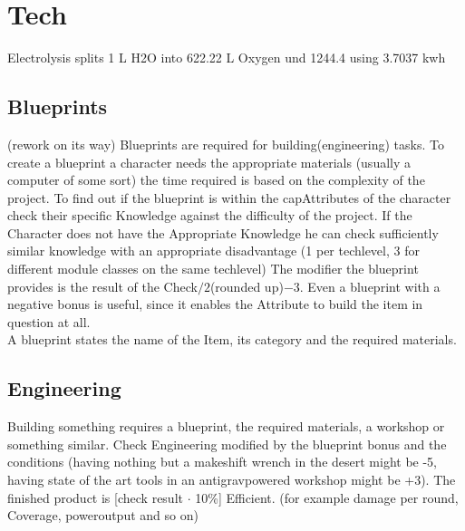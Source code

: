 \section{Tech}\label{subsec:tech}
Electrolysis splits 1 L H2O into 622.22 L Oxygen und 1244.4 using 3.7037 kwh\\
\subsection{Blueprints}
(rework on its way)
Blueprints are required for building(engineering) tasks.
To create a blueprint a character needs the appropriate materials
(usually a computer of some sort) the time required is based on the complexity of the project.
To find out if the
blueprint is within the capAttributes of the character check their specific Knowledge against the difficulty of the
project.
If the Character does not have the Appropriate Knowledge he can check sufficiently similar knowledge with
an appropriate disadvantage (1 per techlevel, 3 for different module classes on the same techlevel)
The modifier the blueprint provides is the result of the Check\(/2\)(rounded up)\(-3\).
Even a blueprint with a negative bonus is useful, since it enables the Attribute to build the item in question at all.\\
A blueprint states the name of the Item, its category and the required materials.\vspace{1.5cm}
\subsection{Engineering}

Building something requires a blueprint, the required materials, a workshop or something similar.
Check Engineering
modified by the blueprint bonus and the conditions (having nothing but a makeshift wrench in the desert might be -5, having state of the art
tools in an antigravpowered workshop might be +3).
The finished product is [check result \(\cdot\) 10\%] Efficient.
(for example damage per round, Coverage, poweroutput and so on)\vspace{1.5cm}
